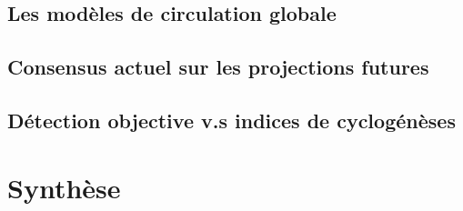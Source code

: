 \documentclass[../main.tex]{subfiles}
\begin{document}
\subsection{Les modèles de circulation globale}

\subsection{Consensus actuel sur les projections futures}

\subsection{Détection objective v.s indices de cyclogénèses}

\section{Synthèse}
\end{document}
